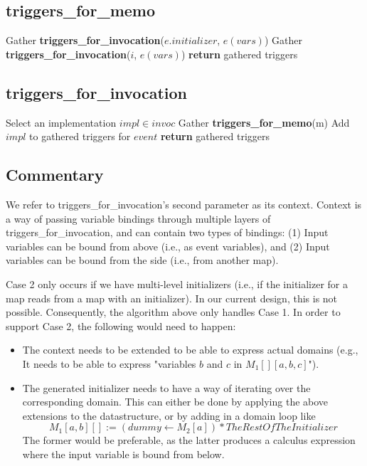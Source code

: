 \documentclass[11pt]{amsart}
\begin{document}
\subsection{triggers\_for\_memo}
\begin{algorithmic}
  \STATE Gather \textbf{triggers\_for\_invocation}($e.initializer$, $e(vars)$)
    \STATE Gather \textbf{triggers\_for\_invocation}($i$, $e(vars)$)
  \ENDFOR
\ENDFOR
\STATE \textbf{return} gathered triggers
\end{algorithmic}

\subsection{triggers\_for\_invocation}
\begin{algorithmic}
\STATE Select an implementation $impl \in invoc$
  \STATE Gather \textbf{triggers\_for\_memo}(m)
\ENDFOR
\STATE Add $impl$ to gathered triggers for $event$
\STATE \textbf{return} gathered triggers
\end{algorithmic}

\subsection{Commentary}
We refer to triggers\_for\_invocation's second parameter as its context.  Context is a way of passing variable bindings through multiple layers of triggers\_for\_invocation, and can contain two types of bindings: (1) Input variables can be bound from above (i.e., as event variables), and (2) Input variables can be bound from the side (i.e., from another map).  

Case 2 only occurs if we have multi-level initializers (i.e., if the initializer for a map reads from a map with an initializer).  In our current design, this is not possible.  Consequently, the algorithm above only handles Case 1.  In order to support Case 2, the following would need to happen:
\begin{itemize}
\item The context needs to be extended to be able to express actual domains (e.g., It needs to be able to express "variables $b$ and $c$ in $M_1[][a,b,c]$").
\item The generated initializer needs to have a way of iterating over the corresponding domain.  This can either be done by applying the above extensions to the datastructure, or by adding in a domain loop like 
$$M_1[a,b][] :=  (dummy \leftarrow M_2[a]) * TheRestOfTheInitializer$$
The former would be preferable, as the latter produces a calculus expression where the input variable is bound from below.
\end{itemize}
\end{document}
